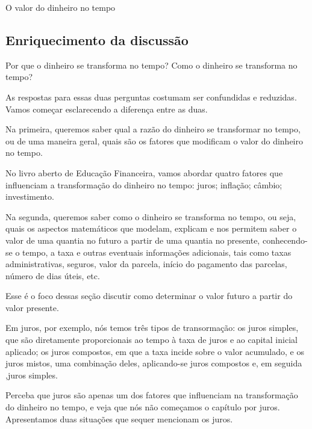 \begin{paginatexto}{O valor do dinheiro no tempo}
\subsection*{Enriquecimento da discussão}

Por que o dinheiro se transforma no tempo? Como o dinheiro se transforma no tempo? 

As respostas para essas duas perguntas costumam ser confundidas e reduzidas. Vamos começar esclarecendo a diferença entre as duas.

Na primeira, queremos saber qual a razão do dinheiro se transformar no tempo, ou de uma maneira geral, quais são os fatores que modificam o valor do dinheiro no tempo.

No livro aberto de Educação Financeira, vamos abordar quatro fatores que influenciam a transformação do dinheiro no tempo: juros; inflação; câmbio; investimento.

Na segunda, queremos saber como o dinheiro se transforma no tempo, ou seja, quais os aspectos matemáticos que modelam, explicam e nos permitem saber o valor de uma quantia no futuro a partir de uma quantia no presente, conhecendo-se o tempo, a taxa e outras eventuais informações adicionais, tais como taxas administrativas, seguros, valor da parcela, início do pagamento das parcelas, número de dias úteis, etc.

Esse é o foco dessas seção discutir como determinar o valor futuro a partir do valor presente.

Em juros, por exemplo, nós temos três tipos de transormação: os juros simples, que são diretamente proporcionais ao tempo à taxa de juros e ao capital inicial aplicado; os juros compostos, em que a taxa incide sobre o valor acumulado, e os juros mistos, uma combinação deles, aplicando-se juros compostos e, em seguida ,juros simples.

Perceba que juros são apenas um dos fatores que influenciam na transformação do dinheiro no tempo, e veja que nós não começamos o capítulo por juros. Apresentamos duas situações que sequer mencionam os juros.
\end{paginatexto}


